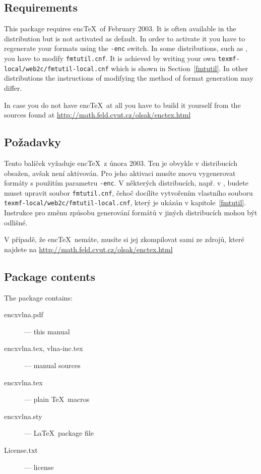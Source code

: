 
\ifeng

\subsection{Requirements}
This package requires enc\TeX\ of February 2003. It is often available in the distribution but is
not activated as default. In order to activate it you have to regenerate your formats using the
\texttt{-enc} switch. In some distributions, such as \TL, you have to modify \texttt{fmtutil.cnf}.
It is achieved by writing your own \texttt{texmf-local/web2c/fmtutil-local.cnf} which
is shown in Section~\ref{fmtutil}. In other distributions the instructions of modifying the method of
format generation may differ.

In case you do not have enc\TeX\ at all you have to build it yourself from the sources found at
\url{http://math.feld.cvut.cz/olsak/enctex.html}

\else

\subsection{\texorpdfstring{Požadavky}{Pozadavky}}
Tento balíček vyžaduje enc\TeX\ z února 2003. Ten je obvykle v distribucích obsažen, avšak není
aktivován. Pro jeho aktivaci musíte znovu vygenerovat formáty s použitím parametru \texttt{-enc}. V
některých distribucích, např. v \TL, budete muset upravit soubor \texttt{fmtutil.cnf},
čehoč docílíte vytvořením vlastního souboru \texttt{texmf-local/web2c/fmtutil-local.cnf}, který je
ukázán v kapitole~\ref{fmtutil}. Instrukce pro změnu způsobu generování formátů v jiných
distribucích mohou být odlišné.

V případě, že enc\TeX\ nemáte, musíte si jej zkompilovat sami ze zdrojů, které najdete na
\url{http://math.feld.cvut.cz/olsak/enctex.html}

\fi


\ifeng

\subsection{Package contents}
The package contains:
\begin{description}
\item[encxvlna.pdf] --- this manual
\item[encxvlna.tex, vlna-inc.tex] --- manual sources
\item[encxvlna.tex] --- plain \TeX\ macros
\item[encxvlna.sty] --- \LaTeX\ package file
\item[License.txt] --- license
\end{description}

